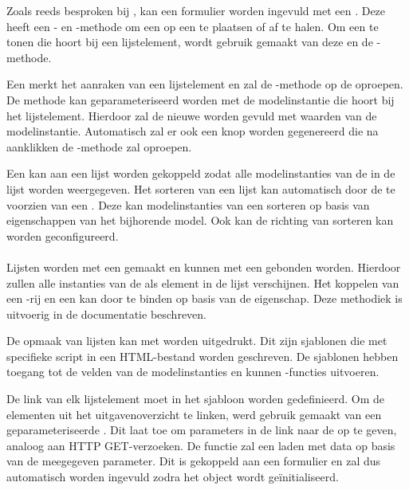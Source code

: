 Zoals reeds besproken bij , kan een formulier worden ingevuld met een .
Deze  heeft een - en -methode om een  op een  te plaatsen of af te halen.
Om een  te tonen die hoort bij een lijstelement, wordt gebruik gemaakt van deze  en de -methode.

Een  merkt het aanraken van een lijstelement en zal de -methode op de  oproepen.
De methode kan geparameteriseerd worden met de modelinstantie die hoort bij het lijstelement.
Hierdoor zal de nieuwe  worden gevuld met waarden van de modelinstantie.
Automatisch zal er ook een  knop worden gegenereerd die na aanklikken de -methode zal oproepen.

Een  kan aan een lijst worden gekoppeld zodat alle modelinstanties van de  in de lijst worden weergegeven.
Het sorteren van een lijst kan automatisch door de  te voorzien van een .
Deze kan modelinstanties van een  sorteren op basis van eigenschappen van het bijhorende model.
Ook kan de richting van sorteren kan worden geconfigureerd.

\paragraph{\kendo}
Lijsten worden met een  gemaakt en kunnen met een  gebonden worden.
Hierdoor zullen alle instanties van de  als element in de lijst verschijnen.
Het koppelen van een \js-rij en een  kan door te binden op basis van de  eigenschap.
Deze methodiek is uitvoerig in de documentatie beschreven.

De opmaak van lijsten kan met  worden uitgedrukt.
Dit zijn sjablonen die met specifieke script in een HTML-bestand worden geschreven.
De sjablonen hebben toegang tot de velden van de modelinstanties en kunnen \js-functies uitvoeren.

De link van elk lijstelement moet in het sjabloon worden gedefinieerd.
Om de elementen uit het uitgavenoverzicht te linken, werd gebruik gemaakt van een geparameteriseerde .
Dit laat toe om parameters in de link naar de  op te geven,  analoog aan HTTP GET-verzoeken.
De functie zal een  laden met data op basis van de meegegeven parameter.
Dit  is gekoppeld aan een formulier en zal dus automatisch worden ingevuld zodra het object wordt geïnitialiseerd.

